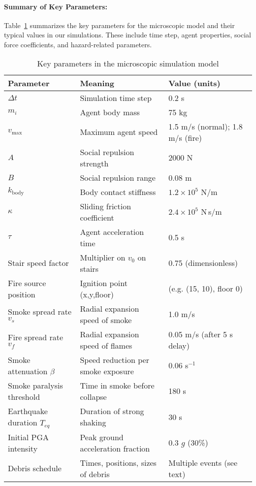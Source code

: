 \documentclass[11pt,a4paper]{article}
\begin{document}
\paragraph{Summary of Key Parameters:} Table~\ref{tab:parameters} summarizes the key parameters for the microscopic model and their typical values in our simulations. These include time step, agent properties, social force coefficients, and hazard-related parameters.
\begin{table}[h!]\small
\centering
\caption{Key parameters in the microscopic simulation model\label{tab:parameters}}
\begin{tabular}{p{3.5cm} p{8cm} p{3cm}}
\toprule
\textbf{Parameter} & \textbf{Meaning} & \textbf{Value (units)} \\
\midrule
$\Delta t$ & Simulation time step & 0.2 s \\
$m_i$ & Agent body mass & 75 kg \\
$v_{\max}$ & Maximum agent speed & 1.5 m/s (normal); 1.8 m/s (fire) \\
$A$ & Social repulsion strength & 2000 N \\
$B$ & Social repulsion range & 0.08 m \\
$k_{\text{body}}$ & Body contact stiffness & $1.2\times10^5$ N/m \\
$\kappa$ & Sliding friction coefficient & $2.4\times10^5$ N\,s/m \\
$\tau$ & Agent acceleration time & 0.5 s \\
Stair speed factor & Multiplier on $v_0$ on stairs & 0.75 (dimensionless) \\
Fire source position & Ignition point (x,y,floor) & (e.g. (15, 10), floor 0) \\
Smoke spread rate $v_s$ & Radial expansion speed of smoke & 1.0 m/s \\
Fire spread rate $v_f$ & Radial expansion speed of flames & 0.05 m/s (after 5 s delay) \\
Smoke attenuation $\beta$ & Speed reduction per smoke exposure & 0.06 s$^{-1}$ \\
Smoke paralysis threshold & Time in smoke before collapse & 180 s \\
Earthquake duration $T_{eq}$ & Duration of strong shaking & 30 s \\
Initial PGA intensity & Peak ground acceleration fraction & 0.3 $g$ (30\%) \\
Debris schedule & Times, positions, sizes of debris & Multiple events (see text) \\
\bottomrule
\end{tabular}
\end{table}
\end{document}
